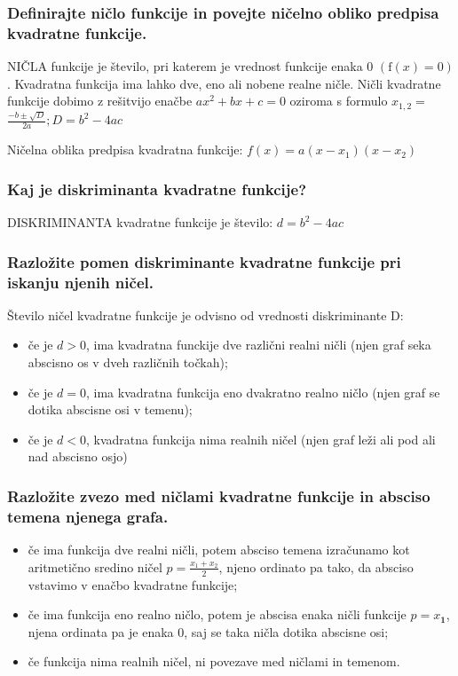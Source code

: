 \documentclass{article}
\begin{document}
\subsubsection*{Definirajte ničlo funkcije in povejte ničelno obliko predpisa kvadratne funkcije.}

NIČLA funkcije je število, pri katerem je vrednost funkcije enaka 0 $(\mathrm{f}(x)=0)$. Kvadratna funkcija ima lahko dve, eno ali nobene realne ničle. Ničli kvadratne funkcije dobimo z rešitvijo enačbe $a x^{2}+b x+c=0$ oziroma s formulo $x_{1, 2}=$ $\frac{-b \pm \sqrt{D}}{2 a} ; D=b^{2}-4 a c$

Ničelna oblika predpisa kvadratna funkcije: $f(x)=a\left(x-x_{1}\right)\left(x-x_{2}\right)$

\subsubsection*{Kaj je diskriminanta kvadratne funkcije?}

DISKRIMINANTA kvadratne funkcije je število: $d=b^{2}-4 a c$

\subsubsection*{Razložite pomen diskriminante kvadratne funkcije pri iskanju njenih ničel.}

Število ničel kvadratne funkcije je odvisno od vrednosti diskriminante D:
\begin{itemize}
    \item če je $d>0$, ima kvadratna funckije dve različni realni ničli (njen graf seka abscisno os v dveh različnih točkah);

  \item če je $d=0$, ima kvadratna funkcija eno dvakratno realno ničlo (njen graf se dotika abscisne osi v temenu);

  \item če je $d<0$, kvadratna funkcija nima realnih ničel (njen graf leži ali pod ali nad abscisno osjo)
\end{itemize}

\subsubsection*{Razložite zvezo med ničlami kvadratne funkcije in absciso temena njenega grafa.}

\begin{itemize}
  \item če ima funkcija dve realni ničli, potem absciso temena izračunamo kot aritmetično sredino ničel $p=\frac{x_{1}+x_{2}}{2}$, njeno ordinato pa tako, da absciso vstavimo v enačbo kvadratne funkcije;

  \item če ima funkcija eno realno ničlo, potem je abscisa enaka ničli funkcije $p=x_{\mathbf{1}}$, njena ordinata pa je enaka 0, saj se taka ničla dotika abscisne osi;

  \item če funkcija nima realnih ničel, ni povezave med ničlami in temenom.
\end{itemize}
\end{document}
